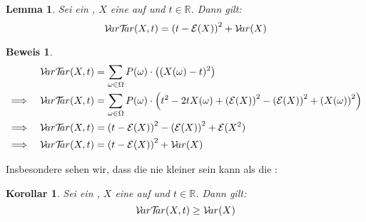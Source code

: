\documentclass[a4paper]{article}
\newtheorem{korollar}[satz]{Korollar}
\newtheorem{lemma}[satz]{Lemma}
\theoremstyle{nonumberplain}
\newtheorem{beweis}{Beweis}
\begin{document}
\begin{lemma}
	Sei \probspaceex{} ein \probspace{}, $X$ eine \rvar{} auf \probspaceex{} und $t \in \mathbb{R}$. Dann gilt:
	\[
	\mathcal{V}\!ar \mathcal{T}\!\!ar(X,t) = \left(t - \mathcal{E}(X)\right)^2 + \mathcal{V}\!ar(X)
	\]
\end{lemma}
\begin{beweis}
	\begin{align*}
	& & \mvt(X,t) & =  \sum_{\omega \in \Omega}{P(\omega) \cdot \left((X(\omega)-t)^2\right)} \\
	\implies & & \mvt(X,t) & = \sum_{\omega \in \Omega}{P(\omega) \cdot \left(t^2 -2tX(\omega) + \left(\mathcal{E}(X)\right)^2 - \left(\mathcal{E}(X)\right)^2 + \left(X(\omega)\right)^2\right)} \\
	\implies & & \mvt(X,t) & = \left(t - \mathcal{E}(X)\right)^2 - \left(\mathcal{E}(X)\right)^2 + \mathcal{E}(X^2) \\
	\implies & & \mvt(X,t) & = \left(t - \mathcal{E}(X)\right)^2 + \mvar(X) \\
	\end{align*}
\end{beweis}
Insbesondere sehen wir, dass die \vt{} nie kleiner sein kann als die \var{}:
\begin{korollar}\label{kor-vtt-rel}
	Sei \probspaceex{} ein \probspace{}, $X$ eine \rvar{} auf \probspaceex{} und $t \in \mathbb{R}$. Dann gilt:
	\[
		\mathcal{V}\!ar \mathcal{T}\!\!ar(X,t) \geq \mathcal{V}\!ar(X)
	\]
\end{korollar}
\begin{comment}
\begin{beweis}
Sei $\mu = \mathcal{E}_{\probspaceexraw{}}(X)$ der Erwartungswert von $X$. So erhalten wir:
\begin{align*}
& & (t-\mu)^2 &\geq 0\\
\implies & & -2t\mu + 2\mu^2 + t^2 - \mu^2 &\geq 0\\
\implies & & \sum_{\omega \in \Omega}{P(\omega)} \cdot (-2t X(\omega) + 2\mu X(\omega) + t^2 - \mu^2) &\geq 0\\
\implies & & \sum_{\omega \in \Omega}{P(\omega)} \cdot \left((X(\omega)-t)^2 - (X(\omega) - \mu)^2\right) &\geq 0\\
\implies & & \sum_{\omega \in \Omega}{P(\omega)} \cdot \left((X(\omega)-t)^2\right) &\geq \sum_{\omega \in \Omega}{P(\omega)} \cdot \left((X(\omega) - \mu)^2\right)\\
\end{align*}
\end{beweis}
\end{comment}
\end{document}
